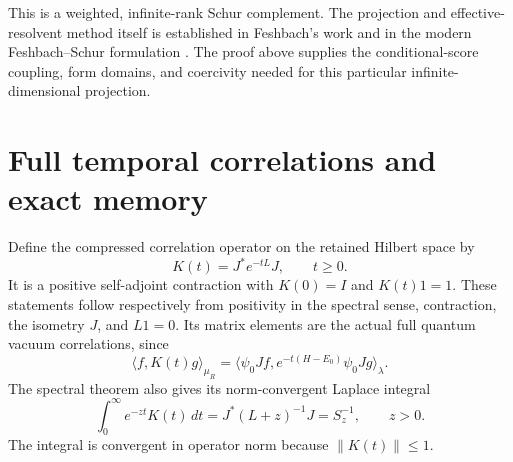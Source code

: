 \documentclass[11pt]{article}
\begin{document}
This is a weighted, infinite-rank Schur complement. The projection and
effective-resolvent method itself is established in Feshbach's work and
in the modern Feshbach--Schur formulation \cite{Feshbach,DSS}. The proof
above supplies the conditional-score coupling, form domains, and
coercivity needed for this particular infinite-dimensional projection.

\section{Full temporal correlations and exact memory}

Define the compressed correlation operator on the retained Hilbert space
by
\begin{equation}\label{eq:Kt}
 K(t)=J^*e^{-tL}J,\qquad t\geq0.
\end{equation}
It is a positive self-adjoint contraction with $K(0)=I$ and $K(t)1=1$.
These statements follow respectively from positivity in the spectral
sense, contraction, the isometry $J$, and $L1=0$. Its matrix elements
are the actual full quantum vacuum correlations, since
\begin{equation}\label{eq:quantumcorrelation}
 \langle f,K(t)g\rangle_{\mu_R}
 =\langle\psi_0Jf,e^{-t(H-E_0)}\psi_0Jg\rangle_\lambda.
\end{equation}
The spectral theorem also gives its norm-convergent Laplace integral
\begin{equation}\label{eq:Laplace}
 \int_0^\infty e^{-zt}K(t)\,dt
 =J^*(L+z)^{-1}J=S_z^{-1},\qquad z>0.
\end{equation}
The integral is convergent in operator norm because $\|K(t)\|\leq1$.
\end{document}
